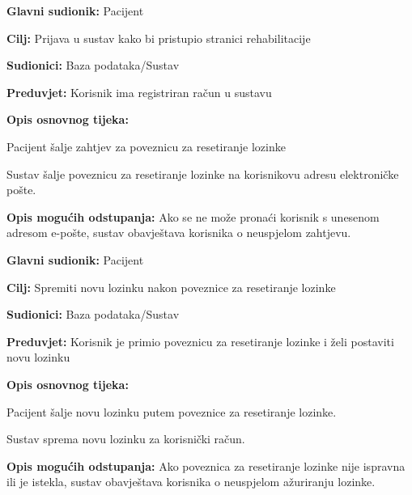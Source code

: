                 \noindent {}
					\begin{packed_item}
	
						\item \textbf{Glavni sudionik: }Pacijent
						\item  \textbf{Cilj:} Prijava u sustav kako bi pristupio stranici rehabilitacije
						\item  \textbf{Sudionici:} Baza podataka/Sustav
						\item  \textbf{Preduvjet:} Korisnik ima registriran račun u sustavu
						\item  \textbf{Opis osnovnog tijeka:}
						
						\item[] \begin{packed_enum}
	
							\item Pacijent šalje zahtjev za poveznicu za resetiranje lozinke
							\item Sustav šalje poveznicu za resetiranje lozinke na korisnikovu adresu elektroničke pošte.
	
						\end{packed_enum}
						
						\item  \textbf{Opis mogućih odstupanja:} Ako se ne može pronaći korisnik s unesenom adresom e-pošte, sustav obavještava korisnika o neuspjelom zahtjevu. 
						
						
					\end{packed_item}

                \noindent {}
					\begin{packed_item}
	
						\item \textbf{Glavni sudionik: }Pacijent
						\item  \textbf{Cilj:} Spremiti novu lozinku nakon poveznice za resetiranje lozinke
						\item  \textbf{Sudionici:} Baza podataka/Sustav
						\item  \textbf{Preduvjet:} Korisnik je primio poveznicu za resetiranje lozinke i želi postaviti novu lozinku
						\item  \textbf{Opis osnovnog tijeka:}
						
						\item[] \begin{packed_enum}
	
							\item Pacijent šalje novu lozinku putem poveznice za resetiranje lozinke.
							\item Sustav sprema novu lozinku za korisnički račun.
	
						\end{packed_enum}
						
						\item  \textbf{Opis mogućih odstupanja:} Ako poveznica za resetiranje lozinke nije ispravna ili je istekla, sustav obavještava korisnika o neuspjelom ažuriranju lozinke. 
						
						
					\end{packed_item}

